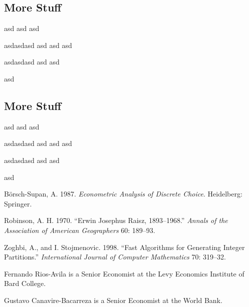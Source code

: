 \documentclass[bib]{statapress}
\begin{document}
\subsection{More Stuff}\label{more-stuff-5}

asd asd asd

asdasdasd asd asd asd

asdasdasd asd asd

asd

\subsection{More Stuff}\label{more-stuff-6}

asd asd asd

asdasdasd asd asd asd

asdasdasd asd asd

asd

\label{refs}
\begin{CSLReferences}{1}{0}
Börsch-Supan, A. 1987. \emph{Econometric Analysis of Discrete Choice}.
Heidelberg: Springer.

Robinson, A. H. 1970. {``Erwin Josephus Raisz, 1893--1968.''}
\emph{Annals of the Association of American Geographers} 60: 189--93.

Zoghbi, A., and I. Stojmenovic. 1998. {``Fast Algorithms for Generating
Integer Partitions.''} \emph{International Journal of Computer
Mathematics} 70: 319--32.

\end{CSLReferences}

\clearpage




%

\begin{aboutauthors}

Fernando Rios-Avila is a Senior Economist at the Levy Economics
Institute of Bard College.

Gustavo Canavire-Bacarreza is a Senior Economist at the World Bank.

\end{aboutauthors}
\end{document}
